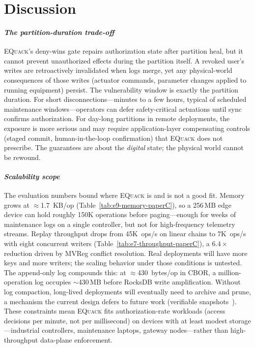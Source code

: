 \documentclass[10pt,journal,compsoc]{IEEEtran}
\newcommand{\equack}{\textsc{EQuack}}
\begin{document}
\section{Discussion}
\label{sec:discussion-paperC}

\paragraph*{\textit{The partition-duration trade-off}}
\equack{}'s deny-wins gate repairs authorization state after partition heal, but it cannot prevent unauthorized effects during the partition itself. A revoked user's writes are retroactively invalidated when logs merge, yet any physical-world consequences of those writes (actuator commands, parameter changes applied to running equipment) persist. The vulnerability window is exactly the partition duration. For short disconnections---minutes to a few hours, typical of scheduled maintenance windows---operators can defer safety-critical actuations until sync confirms authorization. For day-long partitions in remote deployments, the exposure is more serious and may require application-layer compensating controls (staged commit, human-in-the-loop confirmation) that \equack{} does not prescribe. The guarantees are about the \emph{digital} state; the physical world cannot be rewound.

\paragraph*{\textit{Scalability scope}}
The evaluation numbers bound where \equack{} is and is not a good fit. Memory grows at $\approx$1.7~KB/op (Table~\ref{tab:e9-memory-paperC}), so a 256\,MB edge device can hold roughly 150K operations before paging---enough for weeks of maintenance logs on a single controller, but not for high-frequency telemetry streams. Replay throughput drops from 45K~ops/s on linear chains to 7K~ops/s with eight concurrent writers (Table~\ref{tab:e7-throughput-paperC}), a $6.4\times$ reduction driven by MVReg conflict resolution. Real deployments will have more keys and more writers; the scaling behavior under those conditions is untested. The append-only log compounds this: at $\approx$430~bytes/op in CBOR, a million-operation log occupies $\sim$430\,MB before RocksDB write amplification. Without log compaction, long-lived deployments will eventually need to archive and prune, a mechanism the current design defers to future work (verifiable snapshots~\cite{DEEPA2022209}). These constraints mean \equack{} fits authorization-rate workloads (access decisions per minute, not per millisecond) on devices with at least modest storage---industrial controllers, maintenance laptops, gateway nodes---rather than high-throughput data-plane enforcement.
\end{document}
